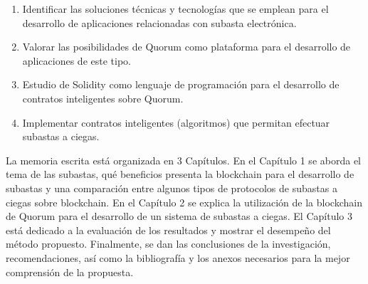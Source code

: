  \begin{enumerate}
    \item Identificar las soluciones técnicas y tecnologías que se emplean para el desarrollo de aplicaciones relacionadas 
    con subasta electrónica.

    \item Valorar las posibilidades de Quorum como plataforma para el desarrollo de aplicaciones de este tipo.

    \item Estudio de Solidity como lenguaje de programación para el desarrollo de contratos inteligentes sobre Quorum.

    \item Implementar contratos inteligentes (algoritmos) que permitan efectuar subastas a ciegas.

  \end{enumerate}

  La memoria escrita está organizada en 3 Capítulos.
  En el Capítulo 1 se aborda el tema de las subastas, qué beneficios presenta la blockchain para el desarrollo de subastas y 
  una comparación entre algunos tipos de protocolos de subastas a ciegas sobre blockchain. En el Capítulo 2 se explica la 
  utilización de la blockchain de Quorum para el desarrollo de un sistema de subastas a ciegas. El Capítulo 3 está dedicado a la 
  evaluación de los resultados y mostrar el desempeño del método propuesto. Finalmente, se dan las conclusiones de la investigación, 
  recomendaciones, así como la bibliografía y los anexos necesarios para la mejor comprensión de la propuesta.
